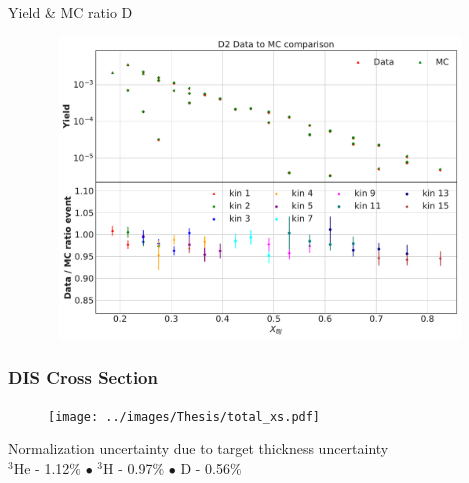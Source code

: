 \documentclass[12pt,usenames,dvipsnames]{beamer}
\begin{document}
\begin{frame}{Yield \& MC ratio D }
\vspace{-0.75cm}
\begin{figure}
\includegraphics[width=12cm,height=8cm]{../images/D2yields.pdf}
\end{figure}
\end{frame}



\begin{frame}{}
\frametitle{DIS Cross Section}
\centering
\vspace{-20pt}
\begin{figure}
\texttt{[image: ../images/Thesis/total\_xs.pdf]}
\end{figure}

Normalization uncertainty due to target thickness uncertainty\\
$^3$He - 1.12$\%$ $\bullet$ $^3$H - 0.97$\%$ $\bullet$  D - 0.56$\%$
\end{frame}
\end{document}
